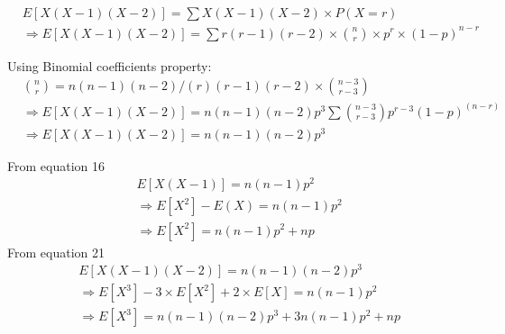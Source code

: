 \documentclass{beamer}
\begin{document}
	\begin{frame}
		\begin{align}
			&E[X(X-1)(X-2)]=\sum X(X-1)(X-2)\times P(X=r)\\
			&\Rightarrow E[X(X-1)(X-2)]=\sum r(r-1)(r-2) \times \binom{n}{r} \times p^{r} \times (1-p)^{n-r}
		\end{align}
		
		Using Binomial coefficients property:\\
		\begin{align}
			&\binom{n}{r}=n(n-1)(n-2)/(r)(r-1)(r-2)\times \binom{n-3}{r-3}\\
			&\Rightarrow E[X(X-1)(X-2)]=n(n-1)(n-2)p^{3}\sum\binom{n-3}{r-3}p^{r-3}(1-p)^{(n-r)}\\
			&\Rightarrow E[X(X-1)(X-2)]=n(n-1)(n-2)p^{3}
		\end{align}
	\end{frame}
	\begin{frame}
		From equation 16
		\begin{align}
			&E[X(X-1)]=n(n-1)p^{2}\\
			&\Rightarrow E[X^{2}]-E(X)=n(n-1)p^{2}\\
			&\Rightarrow E[X^{2}]=n(n-1)p^{2}+np
		\end{align}
		From equation 21
		\begin{align}
			&E[X(X-1)(X-2)]=n(n-1)(n-2)p^{3}\\
			&\Rightarrow E[X^{3}]-3\times E[X^{2}]+2 \times E[X]=n(n-1)p^{2}\\
			&\Rightarrow E[X^{3}]=n(n-1)(n-2)p^{3}+3n(n-1)p^{2}+np
		\end{align}
	\end{frame}
	
	
	
\end{document}
